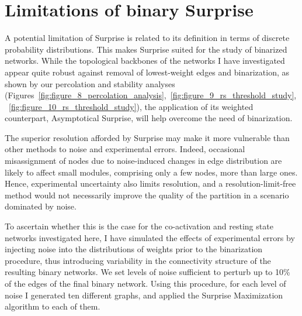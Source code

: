 \section{Limitations of binary Surprise}
A potential limitation of Surprise is related to its definition in terms of discrete probability distributions. This makes Surprise suited for the study of binarized networks. While the topological backbones of the networks I have investigated appear quite robust against removal of lowest-weight edges and binarization, as shown by our percolation and stability analyses (Figures~\ref{fig:figure_8_percolation_analysis},~\ref{fig:figure_9_rs_threshold_study},~\ref{fig:figure_10_rs_threshold_study}), the application of its weighted counterpart, Asymptotical Surprise, will help overcome the need of binarization.

The superior resolution afforded by Surprise may make it more vulnerable than other methods to noise and experimental errors. Indeed, occasional misassignment of nodes due to noise-induced changes in edge distribution are likely to affect small modules, comprising only a few nodes, more than large ones. Hence, experimental uncertainty also limits resolution, and a resolution-limit-free method would not necessarily improve the quality of the partition in a scenario dominated by noise. 

To ascertain whether this is the case for the co-activation and resting state networks investigated here, I have simulated the effects of experimental errors by injecting noise into the distributions of weights prior to the binarization procedure, thus introducing variability in the connectivity structure of the resulting binary networks.
We set levels of noise sufficient to perturb up to 10\% of the edges of the final binary network. Using this procedure, for each level of noise I generated ten different graphs, and applied the Surprise Maximization algorithm to each of them. 

